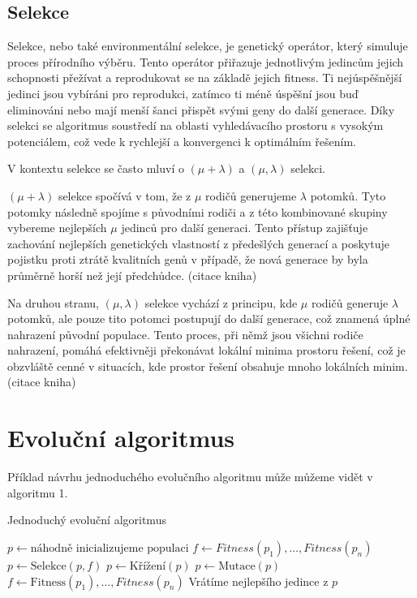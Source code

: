 \subsection{Selekce}
Selekce, nebo také environmentální selekce, je genetický operátor, který simuluje proces přírodního výběru. Tento operátor přiřazuje jednotlivým jedincům jejich schopnosti přežívat a reprodukovat se na základě jejich fitness. Ti nejúspěšnější jedinci jsou vybíráni pro reprodukci, zatímco ti méně úspěšní jsou buď eliminováni nebo mají menší šanci přispět svými geny do další generace. Díky selekci se algoritmus soustředí na oblasti vyhledávacího prostoru s vysokým potenciálem, což vede k rychlejší a konvergenci k optimálním řešením. 

V kontextu selekce se často mluví o $(\mu + \lambda)$ a $(\mu, \lambda)$ selekci. 

$(\mu + \lambda)$ selekce spočívá v tom, že z $\mu$ rodičů generujeme $\lambda$ potomků. Tyto potomky následně spojíme s původními rodiči a z této kombinované skupiny vybereme nejlepších $\mu$ jedinců pro další generaci. Tento přístup zajišťuje zachování nejlepších genetických vlastností z předešlých generací a poskytuje pojistku proti ztrátě kvalitních genů v případě, že nová generace by byla průměrně horší než její předchůdce. (citace kniha)

Na druhou stranu, $(\mu, \lambda)$ selekce vychází z principu, kde $\mu$ rodičů generuje $\lambda$ potomků, ale pouze tito potomci postupují do další generace, což znamená úplné nahrazení původní populace. Tento proces, při němž jsou všichni rodiče nahrazení, pomáhá efektivněji překonávat lokální minima prostoru řešení, což je obzvláště cenné v situacích, kde prostor řešení obsahuje mnoho lokálních minim. (citace kniha)

\section{Evoluční algoritmus}

Příklad návrhu jednoduchého evolučního algoritmu může můžeme vidět v algoritmu 1.

\begin{algorithm}
\caption{Jednoduchý evoluční algoritmus}
\begin{algorithmic}[1]  %
	\State $p \gets \mbox{náhodně inicializujeme populaci}$
    \State $f \gets Fitness(p_1), \dots, Fitness(p_n)$ 
		\State $p \gets \mbox{Selekce}(p, f)$
		\State $p \gets \mbox{Křížení}(p)$
		\State $p \gets \mbox{Mutace}(p)$
        \State $f \gets \mbox{Fitness}(p_1), \dots, Fitness(p_n)$
    \EndWhile
    \State Vrátíme nejlepšího jedince z $p$
\EndFunction
\end{algorithmic}
\end{algorithm}




